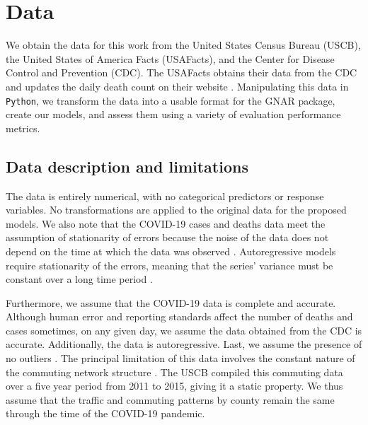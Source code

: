 \section{Data}
\label{sec:data}

We obtain the data for this work from the United States Census Bureau (USCB), the United States of America Facts (USAFacts), and the Center for Disease Control and Prevention (CDC). The {USAFacts} obtains their data from the {CDC} \cite{CDC:2020} and updates the daily death count on their website \cite{AboutUSA15}. Manipulating this data in {\tt{Python}}, we transform the data into a usable format for the {GNAR} package, create our models, and assess them using a variety of evaluation performance metrics. 

\subsection{Data description and limitations} \label{subsection:data_description}

The data is entirely numerical, with no categorical predictors or response variables. No transformations are applied to the original data for the proposed models. We also note that the {COVID-19} cases and deaths data meet the assumption of stationarity of errors because the noise of the data does not depend on the time at which the data was observed \cite{Hyndman:2018}. Autoregressive models require stationarity of the errors, meaning that the series' variance must be constant over a long time period \cite{SS:2021}. 

Furthermore, we assume that the {COVID-19} data is complete and accurate. Although human error and reporting standards affect the number of deaths and cases sometimes, on any given day, we assume the data obtained from the CDC is accurate. Additionally, the data is autoregressive. Last, we assume the presence of no outliers \cite{Frost:2020}.
The principal limitation of this data involves the constant nature of the commuting network structure \cite{USCB:2019}. The {USCB} compiled this commuting data over a five year period from 2011 to 2015, giving it a static property. We thus assume that the traffic and commuting patterns by county remain the same through the time of the {COVID-19} pandemic.


